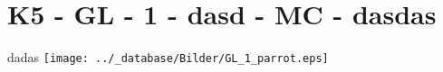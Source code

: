 \section{K5 - GL - 1 - dasd - MC - dasdas}

\begin{beispiel}[K5 - GL]{1}
dadas \texttt{[image: ../\_database/Bilder/GL\_1\_parrot.eps]}
\end{beispiel}